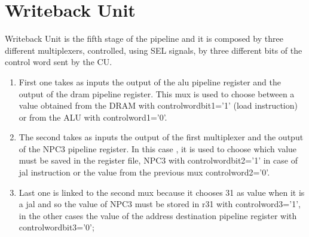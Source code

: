 \chapter{Writeback Unit}
\label{Writeback Unit}
Writeback Unit is the fifth stage of the pipeline and it is composed by three different multiplexers, controlled, using SEL signals, by three different bits of the control word sent by the CU.
\begin{enumerate} 
    \item First one takes as inputs the output of the alu pipeline register and the output of the dram pipeline register. This mux is used to choose between a value obtained
    from the DRAM with controlwordbit1='1' (load instruction) or from the ALU with controlword1='0'.
    \item The second takes as inputs the output of the first multiplexer and the output of the NPC3 pipeline register. In this case , it is used to choose which value must be saved
    in the register file, NPC3 with controlwordbit2='1' in case of jal instruction or the value from the previous mux controlword2='0'.
    \item Last one is linked to the second mux because it chooses 31 as value when it is a jal and so the value of NPC3 must be stored in r31 with controlword3='1', in the other cases
    the value of the address destination pipeline register with controlwordbit3='0';
\end{enumerate}